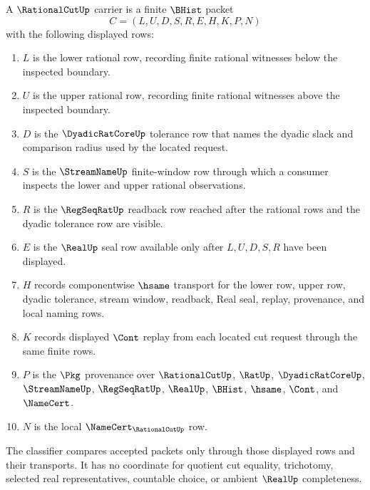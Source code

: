 \begin{definition}
\label{def:rational-cut-carrier}
A $\RationalCutUp$ carrier is a finite $\BHist$ packet
$$
C=(L,U,D,S,R,E,H,K,P,N)
$$
with the following displayed rows:
\begin{enumerate}
\item $L$ is the lower rational row, recording finite rational witnesses below the inspected boundary.
\item $U$ is the upper rational row, recording finite rational witnesses above the inspected boundary.
\item $D$ is the $\DyadicRatCoreUp$ tolerance row that names the dyadic slack and comparison radius used by the located request.
\item $S$ is the $\StreamNameUp$ finite-window row through which a consumer inspects the lower and upper rational observations.
\item $R$ is the $\RegSeqRatUp$ readback row reached after the rational rows and the dyadic tolerance row are visible.
\item $E$ is the $\RealUp$ seal row available only after $L,U,D,S,R$ have been displayed.
\item $H$ records componentwise $\hsame$ transport for the lower row, upper row, dyadic tolerance, stream window, readback, Real seal, replay, provenance, and local naming rows.
\item $K$ records displayed $\Cont$ replay from each located cut request through the same finite rows.
\item $P$ is the $\Pkg$ provenance over $\RationalCutUp$, $\RatUp$, $\DyadicRatCoreUp$, $\StreamNameUp$, $\RegSeqRatUp$, $\RealUp$, $\BHist$, $\hsame$, $\Cont$, and $\NameCert$.
\item $N$ is the local $\NameCert_{\RationalCutUp}$ row.
\end{enumerate}
The classifier compares accepted packets only through those displayed rows and their transports. It has no coordinate for quotient cut equality, trichotomy, selected real representatives, countable choice, or ambient $\RealUp$ completeness.
\end{definition}

